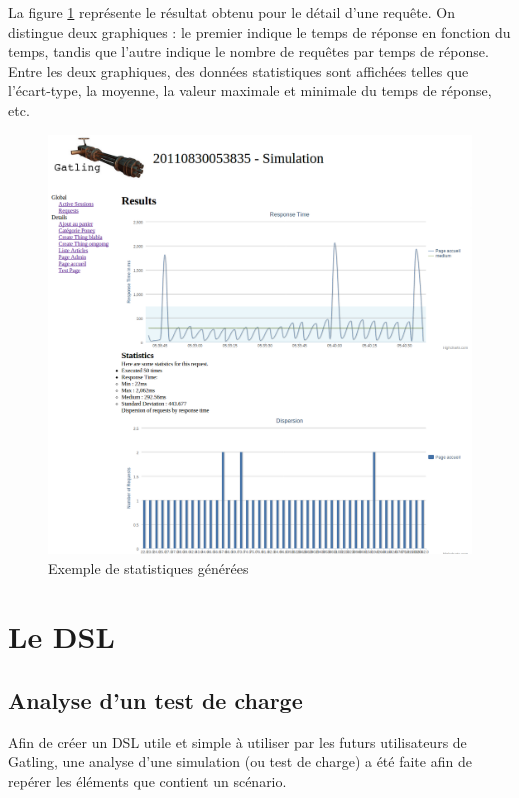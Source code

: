 La figure \ref{stats_exp} représente le résultat obtenu pour le détail d'une requête. On distingue deux graphiques : le premier indique le temps de réponse en fonction du temps, tandis que l'autre indique le nombre de requêtes par temps de réponse. Entre les deux graphiques, des données statistiques sont affichées telles que l'écart-type, la moyenne, la valeur maximale et minimale du temps de réponse, etc.

\begin{figure}[h]
\begin{center}
\includegraphics{img/stats_exp.png}
\end{center}
\caption{Exemple de statistiques générées}
\label{stats_exp}
\end{figure}

\section{Le DSL}
\subsection{Analyse d'un test de charge}
Afin de créer un DSL utile et simple à utiliser par les futurs utilisateurs de Gatling, une analyse d'une simulation (ou test de charge) a été faite afin de repérer les éléments que contient un scénario.


